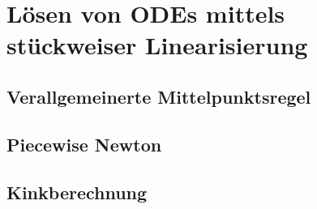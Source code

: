 \chapter{Lösen von ODEs mittels stückweiser Linearisierung}
\section{Verallgemeinerte Mittelpunktsregel}


\section{Piecewise Newton}

\section{Kinkberechnung}